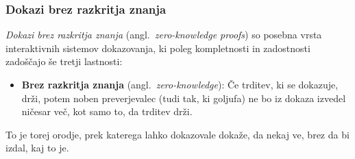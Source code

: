 \documentclass[isrm2, tisk]{fmfdelo}
\begin{document}
\subsubsection{Dokazi brez razkritja znanja}
\textit{Dokazi brez razkritja znanja} (angl.\ \textit{zero-knowledge proofs}) so posebna vrsta interaktivnih
sistemov dokazovanja, ki poleg kompletnosti in zadostnosti zadoščajo še tretji lastnosti:
\begin{itemize}
    \item \textbf{Brez razkritja znanja} (angl.\ \textit{zero-knowledge}): Če trditev, ki se dokazuje, 
        drži, potem noben preverjevalec (tudi tak, ki goljufa) ne bo iz dokaza izvedel ničesar več, 
        kot samo to, da trditev drži.
\end{itemize}
To je torej orodje, prek katerega lahko dokazovale dokaže, da nekaj ve, brez da bi izdal, kaj to je.
\end{document}
